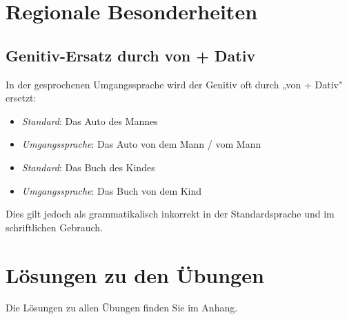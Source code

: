 \section{Regionale Besonderheiten}
\label{sec:RegionaleBesonderheiten}

\subsection{Genitiv-Ersatz durch von + Dativ}
In der gesprochenen Umgangssprache wird der Genitiv oft durch „von + Dativ" ersetzt:
\begin{itemize}
    \item \textit{Standard}: Das Auto des Mannes
    \item \textit{Umgangssprache}: Das Auto von dem Mann / vom Mann
    \item \textit{Standard}: Das Buch des Kindes
    \item \textit{Umgangssprache}: Das Buch von dem Kind
\end{itemize}

Dies gilt jedoch als grammatikalisch inkorrekt in der Standardsprache und im schriftlichen Gebrauch.

\section{Lösungen zu den Übungen}
\label{sec:Loesungen}

Die Lösungen zu allen Übungen finden Sie im Anhang.

\chapterend